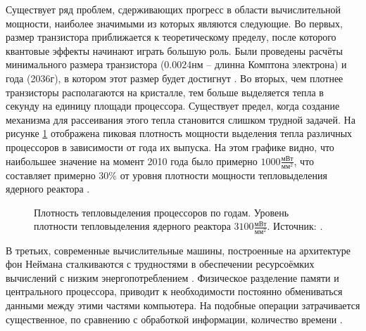\par
Существует ряд проблем, сдерживающих прогресс в области вычислительной мощности, наиболее значимыми из которых являются следующие. Во первых, размер транзистора приближается к теоретическому пределу, после которого квантовые эффекты начинают играть большую роль. Были проведены расчёты минимального размера транзистора ($0.0024$нм -- длинна Комптона электрона) и года (2036г), в котором этот размер будет достигнут \cite{powell2008quantum}. Во вторых, чем плотнее транзисторы располагаются на кристалле, тем больше выделяется тепла в секунду на единицу площади процессора. Существует предел, когда создание механизма для рассеивания этого тепла становится слишком трудной задачей. На рисунке \ref{ris:WattD} отображена пиковая плотность мощности выделения тепла различных процессоров в зависимости от года их выпуска. На этом графике видно, что наибольшее значение на момент 2010 года было примерно $1000\frac{\text{мВт}}{\text{мм}^2}$, что составляет примерно $30\%$ от уровня плотности мощности тепловыделения ядерного реактора \cite{khan2021advancements}.
\begin{figure}[htbp]
	\caption{Плотность тепловыделения процессоров по годам. Уровень плотности тепловыделения ядерного реактора $3100\frac{\text{мВт}}{\text{мм}^2}$. Источник: \cite{danowitz2014exploring}.}
	\label{ris:WattD}
\end{figure}
В третьих, современные вычислительные машины, построенные на архитектуре фон Неймана сталкиваются с трудностями в обеспечении ресурсоёмких вычислений с низким энергопотреблением \cite{indiveri2015memory}. Физическое разделение памяти и центрального процессора, приводит к необходимости постоянно обмениваться данными между этими частями компьютера. На подобные операции затрачивается существенное, по сравнению с обработкой информации, количество времени \cite{mahapatra1999processor}.
